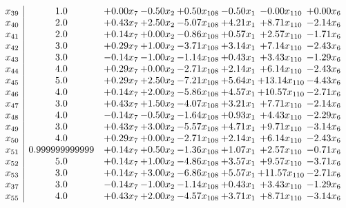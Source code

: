 \documentclass[8pt]{article}
\begin{document}
\[\begin{array}{c| c c@{\hskip 2pt} c@{\hskip 2pt} c@{\hskip 2pt} c@{\hskip 2pt} c@{\hskip 2pt} c@{\hskip 2pt} }
 x_{39}   &  1.0 & +  0.00 x_{7} & -0.50 x_{2} & +  0.50 x_{108} & -0.50 x_{1} & -0.00 x_{110} & +  0.00 x_{6}\\
 x_{40}   &  2.0 & +  0.43 x_{7} & +  2.50 x_{2} & -5.07 x_{108} & +  4.21 x_{1} & +  8.71 x_{110} & -2.14 x_{6}\\
 x_{41}   &  2.0 & +  0.14 x_{7} & +  0.00 x_{2} & -0.86 x_{108} & +  0.57 x_{1} & +  2.57 x_{110} & -1.71 x_{6}\\
 x_{42}   &  3.0 & +  0.29 x_{7} & +  1.00 x_{2} & -3.71 x_{108} & +  3.14 x_{1} & +  7.14 x_{110} & -2.43 x_{6}\\
 x_{43}   &  3.0 & -0.14 x_{7} & -1.00 x_{2} & -1.14 x_{108} & +  0.43 x_{1} & +  3.43 x_{110} & -1.29 x_{6}\\
 x_{44}   &  4.0 & +  0.29 x_{7} & +  0.00 x_{2} & -2.71 x_{108} & +  2.14 x_{1} & +  6.14 x_{110} & -2.43 x_{6}\\
 x_{45}   &  5.0 & +  0.29 x_{7} & +  2.50 x_{2} & -7.21 x_{108} & +  5.64 x_{1} & + 13.14 x_{110} & -4.43 x_{6}\\
 x_{46}   &  4.0 & +  0.14 x_{7} & +  2.00 x_{2} & -5.86 x_{108} & +  4.57 x_{1} & + 10.57 x_{110} & -2.71 x_{6}\\
 x_{47}   &  3.0 & +  0.43 x_{7} & +  1.50 x_{2} & -4.07 x_{108} & +  3.21 x_{1} & +  7.71 x_{110} & -2.14 x_{6}\\
 x_{48}   &  4.0 & -0.14 x_{7} & -0.50 x_{2} & -1.64 x_{108} & +  0.93 x_{1} & +  4.43 x_{110} & -2.29 x_{6}\\
 x_{49}   &  3.0 & +  0.43 x_{7} & +  3.00 x_{2} & -5.57 x_{108} & +  4.71 x_{1} & +  9.71 x_{110} & -3.14 x_{6}\\
 x_{50}   &  4.0 & +  0.29 x_{7} & +  0.00 x_{2} & -2.71 x_{108} & +  2.14 x_{1} & +  6.14 x_{110} & -2.43 x_{6}\\
 x_{51}   &  0.999999999999 & +  0.14 x_{7} & +  0.50 x_{2} & -1.36 x_{108} & +  1.07 x_{1} & +  2.57 x_{110} & -0.71 x_{6}\\
 x_{52}   &  5.0 & +  0.14 x_{7} & +  1.00 x_{2} & -4.86 x_{108} & +  3.57 x_{1} & +  9.57 x_{110} & -3.71 x_{6}\\
 x_{53}   &  3.0 & +  0.14 x_{7} & +  3.00 x_{2} & -6.86 x_{108} & +  5.57 x_{1} & + 11.57 x_{110} & -2.71 x_{6}\\
 x_{37}   &  3.0 & -0.14 x_{7} & -1.00 x_{2} & -1.14 x_{108} & +  0.43 x_{1} & +  3.43 x_{110} & -1.29 x_{6}\\
 x_{55}   &  4.0 & +  0.43 x_{7} & +  2.00 x_{2} & -4.57 x_{108} & +  3.71 x_{1} & +  8.71 x_{110} & -3.14 x_{6}\\

\end{array}\]
\end{document}
